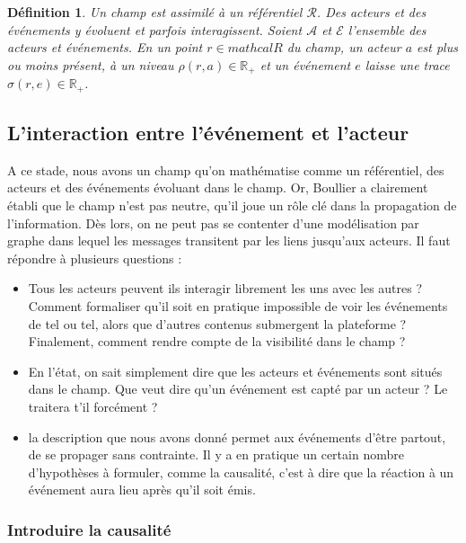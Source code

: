 \documentclass[11pt]{article}
\newtheorem{definition}{Définition}[section]
\begin{document}
			\begin{definition}
				Un champ est assimilé à un référentiel $\mathcal{R}$. Des acteurs et des événements y évoluent et parfois interagissent. Soient $\mathcal{A}$ et $\mathcal{E}$ l'ensemble des acteurs et événements. En un point $r \in mathcal{R}$ du champ, un acteur $a$ est plus ou moins présent, à un niveau $\rho(r,a) \in \mathbb{R}_+$ et un événement $e$ laisse une trace $\sigma(r,e) \in \mathbb{R}_+$. 
			\end{definition}
		
		\subsection{L'interaction entre l'événement et l'acteur}
		
			A ce stade, nous avons un champ qu'on mathématise comme un référentiel, des acteurs et des événements évoluant dans le champ. Or, Boullier a clairement établi que le champ n'est pas neutre, qu'il joue un rôle clé dans la propagation de l'information. Dès lors, on ne peut pas se contenter d'une modélisation par graphe dans lequel les messages transitent par les liens jusqu'aux acteurs. Il faut répondre à plusieurs questions : 
			\begin{itemize}
				\item Tous les acteurs peuvent ils interagir librement les uns avec les autres ? Comment formaliser qu'il soit en pratique impossible de voir les événements de tel ou tel, alors que d'autres contenus submergent la plateforme ? Finalement, comment rendre compte de la visibilité dans le champ ? 
				\item En l'état, on sait simplement dire que les acteurs et événements sont situés dans le champ. Que veut dire qu'un événement est capté par un acteur ? Le traitera t'il forcément ? 
				\item la description que nous avons donné permet aux événements d'être partout, de se propager sans contrainte. Il y a en pratique un certain nombre d'hypothèses à formuler, comme la causalité, c'est à dire que la réaction à un événement aura lieu après qu'il soit émis. 
			\end{itemize}
		
			\subsubsection*{Introduire la causalité}
			
\end{document}
